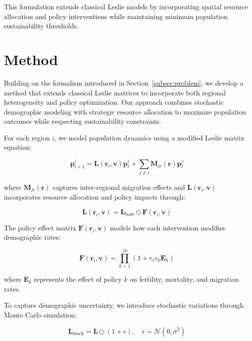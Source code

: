 \documentclass{article} %
\begin{document}
This formulation extends classical Leslie models by incorporating spatial resource allocation and policy interventions while maintaining minimum population sustainability thresholds.

\section{Method}
\label{sec:method}

Building on the formalism introduced in Section~\ref{subsec:problem}, we develop a method that extends classical Leslie matrices to incorporate both regional heterogeneity and policy optimization. Our approach combines stochastic demographic modeling with strategic resource allocation to maximize population outcomes while respecting sustainability constraints.

For each region $i$, we model population dynamics using a modified Leslie matrix equation:

\begin{equation}
    \mathbf{p}_{t+1}^i = \mathbf{L}(\mathbf{r}_i, \mathbf{v}) \mathbf{p}_t^i + \sum_{j \neq i} \mathbf{M}_{ji}(\mathbf{r}) \mathbf{p}_t^j
\end{equation}

where $\mathbf{M}_{ji}(\mathbf{r})$ captures inter-regional migration effects and $\mathbf{L}(\mathbf{r}_i, \mathbf{v})$ incorporates resource allocation and policy impacts through:

\begin{equation}
    \mathbf{L}(\mathbf{r}_i, \mathbf{v}) = \mathbf{L}_{\text{base}} \odot \mathbf{F}(\mathbf{r}_i, \mathbf{v})
\end{equation}

The policy effect matrix $\mathbf{F}(\mathbf{r}_i, \mathbf{v})$ models how each intervention modifies demographic rates:

\begin{equation}
    \mathbf{F}(\mathbf{r}_i, \mathbf{v}) = \prod_{k=1}^{10} (1 + r_i v_k \mathbf{E}_k)
\end{equation}

where $\mathbf{E}_k$ represents the effect of policy $k$ on fertility, mortality, and migration rates.

To capture demographic uncertainty, we introduce stochastic variations through Monte Carlo simulation:

\begin{equation}
    \mathbf{L}_{\text{stoch}} = \mathbf{L} \odot (1 + \epsilon), \quad \epsilon \sim \mathcal{N}(0, \sigma^2)
\end{equation}
\end{document}
